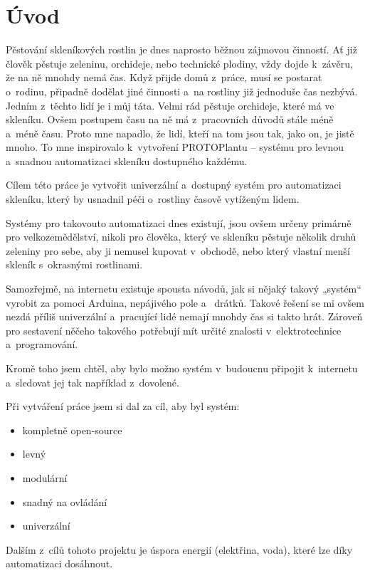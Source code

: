 \chapter*{Úvod}
Pěstování skleníkových rostlin je dnes naprosto běžnou zájmovou činností. 
Ať již člověk pěstuje zeleninu, orchideje, nebo technické plodiny, vždy dojde k~závěru, že na ně mnohdy nemá čas.
Když přijde domů z~práce, musí se postarat o~rodinu, připadně dodělat jiné činnosti a~na rostliny již jednoduše čas nezbývá.
Jedním z~těchto lidí je i můj táta.
Velmi rád pěstuje orchideje, které má ve skleníku.
Ovšem postupem času na ně má z~pracovních důvodů stále méně a~méně času.
Proto mne napadlo, že lidí, kteří na tom jsou tak, jako on, je jistě mnoho.
To mne inspirovalo k~vytvoření PROTOPlantu -- systému pro levnou a~snadnou automatizaci skleníku dostupného každému. 

Cílem této práce je vytvořit univerzální a~dostupný systém pro automatizaci skleníku, který by usnadnil péči o~rostliny časově vytíženým lidem. 

Systémy pro takovouto automatizaci dnes existují, jsou ovšem určeny primárně pro velkozemědělství, nikoli pro člověka, který ve skleníku pěstuje několik druhů zeleniny pro sebe, aby ji nemusel kupovat v~obchodě, nebo který vlastní menší skleník s~okrasnými rostlinami. 

Samozřejmě, na internetu existuje spousta návodů, jak si nějaký takový „systém“ vyrobit za pomoci Arduina, nepájivého pole a~ drátků.
Takové řešení se mi ovšem nezdá příliš univerzální a~pracující lidé nemají mnohdy čas si takto hrát.
Zároveň pro sestavení něčeho takového potřebují mít určité znalosti v~elektrotechnice a~programování.

Kromě toho jsem chtěl, aby bylo možno systém v~budoucnu připojit k~internetu a~sledovat jej tak například z~dovolené.
\newline

Při vytváření práce jsem si dal za cíl, aby byl systém:
\begin{itemize}
    \item kompletně open-source
    \item levný
    \item modulární
    \item snadný na ovládání
    \item univerzální
\end{itemize}

Dalším z~cílů tohoto projektu je úspora energií (elektřina, voda), které lze díky automatizaci dosáhnout.

\newpage
